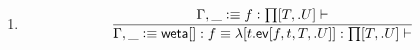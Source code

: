 \documentclass[11pt]{article}
\newcommand{\eqd}{\equiv}
\newcommand{\ccheck}{\vcentcolon}            %
\newcommand{\Okay}{\mathop{\text{ \sc okay}}}
\newcommand{\Context}{\vdash\Okay}
\renewcommand{\Context}{\vdash}
\newcommand{\ha}[2]{#1[#2]}
\newcommand{\weta}{{\sf weta}}
\newcommand{\annot}{{\sf annot}}
\newcommand{\haa}[2]{\ha\annot{#1,#2}}
\renewcommand{\haa}[2]{#1}
\newcommand{\ev}{{\sf ev}}
\newcommand{\var}{\char`_}
\newcommand{\defn}{\vcentcolon\equiv}
\begin{document}
\begin{enumerate}

(It would be better if $\beta$-reduction were free-running, without the
necessity of tracking the types $T$ and $U$.)

\item 
\[
  \frac{\Gamma, \var\defn f \ccheck{\ha\prod{T,.U}}\Context}
       {\Gamma, \var\defn \ha\weta{} : f \eqd \ha\lambda{t.\ha\ev{f,t,T,.U}} : \ha\prod{T,.U}\Context}
\]

\end{enumerate}



\end{document}
